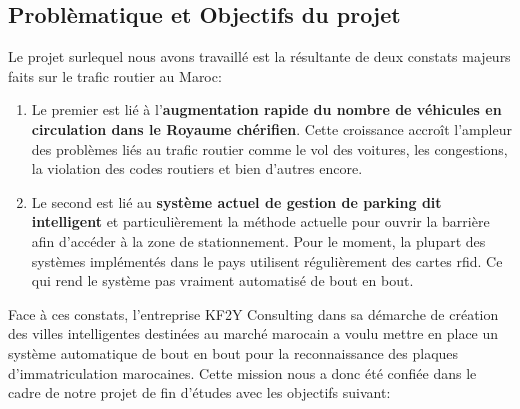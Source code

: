     \subsection{Problèmatique et Objectifs du projet}
    Le projet surlequel nous avons travaillé est la résultante de deux constats majeurs faits sur le trafic routier au Maroc:
    \begin{enumerate}
            \item Le premier est lié à l’\textbf{augmentation rapide du nombre de véhicules en circulation dans le Royaume chérifien}.  Cette croissance accroît l’ampleur des problèmes liés au trafic routier comme le vol des voitures, les congestions, la violation des codes routiers et bien d’autres encore. 
            \item Le second  est lié au \textbf{système actuel de gestion de parking dit intelligent} et particulièrement la méthode actuelle pour ouvrir la barrière afin d'accéder à la zone de stationnement. Pour le moment, la plupart des systèmes implémentés dans le pays utilisent régulièrement des cartes \acrshort{rfid}. Ce qui rend le système pas vraiment automatisé de bout en bout.
        \end{enumerate}
    Face à ces constats, l’entreprise KF2Y Consulting dans sa démarche de création des villes intelligentes destinées au marché marocain a voulu mettre en place un système automatique de bout en bout pour la reconnaissance des plaques d’immatriculation marocaines.  Cette mission nous a donc été confiée dans le cadre de notre projet de fin d'études avec les objectifs suivant:
